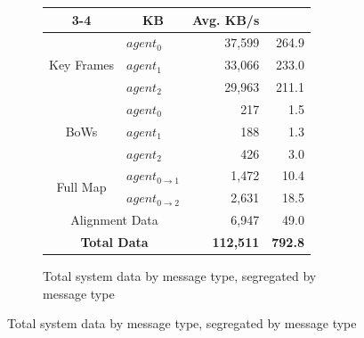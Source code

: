 \begin{figure}[h]
\begin{subfigure}[b]{0.45\linewidth}
{{                \def\arraystretch{1.2}
                \begin{tabular}{ |c|l|r|r| }
                    \cline{3-4}
                    \multicolumn{2}{}{}                       & \multicolumn{1}{|c|}{KB} & \multicolumn{1}{|c|}{Avg. KB/s}         \\
                    \hline
                    \multirow{3}{*}{Key Frames}               & $agent_0$                & 37,599                          & 264.9 \\
                                                              & $agent_1$                & 33,066                          & 233.0 \\
                                                              & $agent_2$                & 29,963                          & 211.1 \\
                    \hline
                    \multirow{3}{*}{BoWs}                     & $agent_0$                & 217                             & 1.5   \\
                                                              & $agent_1$                & 188                             & 1.3   \\
                                                              & $agent_2$                & 426                             & 3.0   \\
                    \hline
                    \multirow{2}{*}{Full Map}
                                                              & $agent_{0\to1}$          & 1,472                           & 10.4  \\
                                                              & $agent_{0\to2}$          & 2,631                           & 18.5  \\
                    \hline
                    \multicolumn{2}{|c|}{Alignment Data}      & 6,947                    & 49.0                                    \\
                    \hline
                    \multicolumn{2}{|c|}{\textbf{Total Data}} & \textbf{112,511}         & \textbf{792.8}                          \\
                    \hline
                \end{tabular}
            }
        }
        \caption{Total system data by message type, segregated by message type}
        \vfill


\end{subfigure}
\end{figure}
